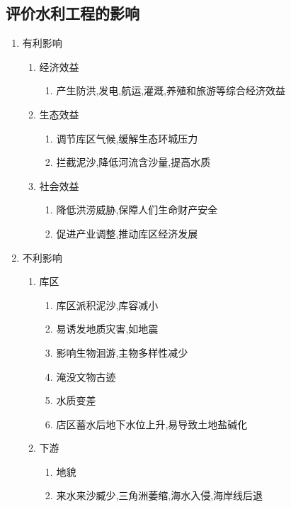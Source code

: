 \documentclass[a4paper]{article}
\begin{document}
    \subsection{评价水利工程的影响}
    \begin{enumerate}
        \item 有利影响
        \begin{enumerate}
            \item 经济效益
            \begin{enumerate}
                \item 产生防洪,发电,航运,灌溉,养殖和旅游等综合经济效益
            \end{enumerate}
            \item 生态效益
            \begin{enumerate}
                \item 调节库区气候,缓解生态环城压力
                \item 拦截泥沙,降低河流含沙量,提高水质
            \end{enumerate}
            \item 社会效益
            \begin{enumerate}
                \item 降低洪涝威胁,保障人们生命财产安全
                \item 促进产业调整,推动库区经济发展
            \end{enumerate}
        \end{enumerate}
        \item 不利影响
        \begin{enumerate}
            \item 库区
            \begin{enumerate}
                \item 库区派积泥沙,库容减小
                \item 易诱发地质灾害,如地震
                \item 影响生物洄游,主物多样性减少
                \item 淹没文物古迹
                \item 水质变差
                \item 店区蓄水后地下水位上升,易导致土地盐碱化
            \end{enumerate}
            \item 下游
            \begin{enumerate}
                \item 地貌
                    \item 来水来沙臧少,三角洲萎缩,海水入侵,海岸线后退

\end{enumerate}
\end{enumerate}
\end{enumerate}
\end{document}
